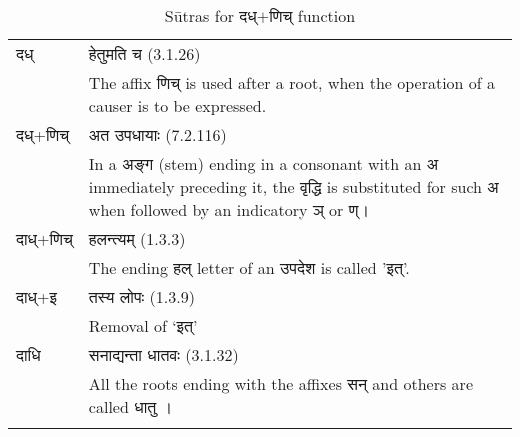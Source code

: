 
		\begin{longtable}{ |p{1.6cm}|p{14.4cm}| } 
			\hline
			\rowcolor{red!10}
			\texthindi{दध्}
			&	
			\texthindi{हेतुमति च} (3.1.26) \\
			\rowcolor{red!10}
			&The affix \texthindi{णिच्} is used after a root, when the operation of a causer is to be expressed.
			\\\hline
			\rowcolor{green!10}
			\texthindi{दध्}+\texthindi{णिच्}
			&\texthindi{अत उपधायाः} (7.2.116) \\
			\rowcolor{green!10}
			&In a \texthindi{अङ्ग} (stem) ending in a consonant with an अ immediately preceding it, the \texthindi{वृद्धि} is substituted for such \texthindi{अ} when followed by an indicatory \texthindi{ञ्} or \texthindi{ण्}।
			\\\hline
			\rowcolor{blue!10}
			\texthindi{दाध्}+\texthindi{णिच्}
			&
			\texthindi{हलन्त्यम्} (1.3.3)\\
			\rowcolor{blue!10}
			&The ending \texthindi{हल्} letter of an \texthindi{उपदेश} is called '\texthindi{इत्}'.
			\\\hline
			\rowcolor{blue!10}
			\texthindi{दाध्}+\texthindi{इ}
			&
			\texthindi{तस्य लोपः} (1.3.9)\\
			\rowcolor{blue!10}
			&Removal of ‘\texthindi{इत्}’
			\\\hline
			\rowcolor{yellow!10}
			\texthindi{दाधि}
			&\texthindi{सनाद्यन्ता धातवः} (3.1.32)\\
			\rowcolor{yellow!10}
			&All the roots ending with the affixes \texthindi{सन्} and others are called \texthindi{धातु} ।
			\\\hline

		\caption{Sūtras for \texthindi{दध्$+$णिच्} function}
		\label{table:a3}
		\end{longtable}


